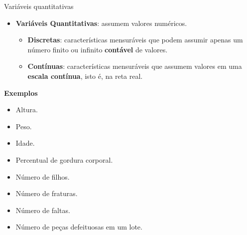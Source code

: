 \documentclass[
  ignorenonframetext,
  serif,
  professionalfont,
  usenames,
  dvipsnames,
  aspectratio = 169]{beamer}
\providecommand{\tightlist}{%
  \setlength{\itemsep}{0pt}\setlength{\parskip}{0pt}}
\renewcommand{\tightlist}{%
  \setlength{\itemsep}{0\baselineskip}
  \setlength{\parskip}{0.25\baselineskip}
}
\def\beginAHalfColumn{\begin{minipage}{0.49\textwidth}}%
\def\endColumns{\end{minipage}}%
\begin{document}
\begin{frame}{Variáveis quantitativas}
\protect\hypertarget{variuxe1veis-quantitativas}{}
\beginAHalfColumn

\begin{itemize}
\tightlist
\item
  \textbf{Variáveis Quantitativas}: assumem valores numéricos.

  \begin{itemize}
  \tightlist
  \item
    \textbf{Discretas}: características mensuráveis que podem assumir
    apenas um número finito ou infinito \textbf{contável} de valores.
  \item
    \textbf{Contínuas}: características mensuráveis que assumem valores
    em uma \textbf{escala contínua}, isto é, na reta real.
  \end{itemize}
\end{itemize}

\endColumns
\beginAHalfColumn

\textbf{Exemplos}

\begin{itemize}
\tightlist
\item
  Altura.
\item
  Peso.
\item
  Idade.
\item
  Percentual de gordura corporal.
\item
  Número de filhos.
\item
  Número de fraturas.
\item
  Número de faltas.
\item
  Número de peças defeituosas em um lote.
\end{itemize}

\endColumns
\end{frame}
\end{document}

